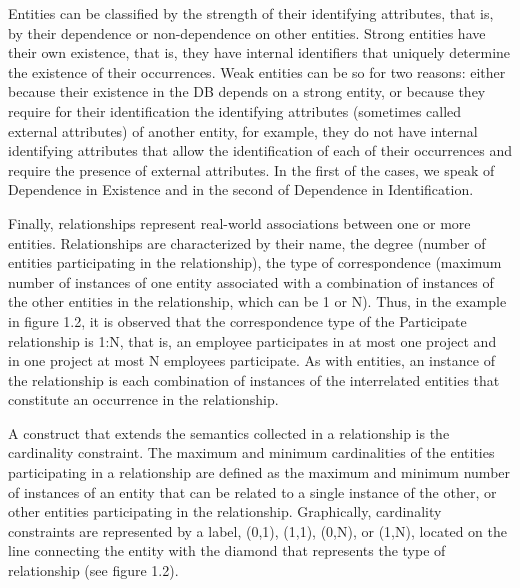 \documentclass{article}
\begin{document}
Entities can be classified by the strength of their identifying attributes, that is, by their dependence or non-dependence on other entities.  Strong entities have their own existence, that is, they have internal identifiers that uniquely determine the existence of their occurrences.  Weak entities can be so for two reasons: either because their existence in the DB depends on a strong entity, or because they require for their identification the identifying attributes (sometimes called external attributes) of another entity, for example, they do not have internal identifying attributes that allow the identification of each of their occurrences and require the presence of external attributes.  In the first of the cases, we speak of Dependence in Existence and in the second of Dependence in Identification.

Finally, relationships represent real-world associations between one or more entities.  Relationships are characterized by their name, the degree (number of entities participating in the relationship), the type of correspondence (maximum number of instances of one entity associated with a combination of instances of the other entities in the relationship, which can be 1 or N).  Thus, in the example in figure 1.2, it is observed that the correspondence type of the Participate relationship is 1:N, that is, an employee participates in at most one project and in one project at most N employees participate.  As with entities, an instance of the relationship is each combination of instances of the interrelated entities that constitute an occurrence in the relationship.

A construct that extends the semantics collected in a relationship is the cardinality constraint.  The maximum and minimum cardinalities of the entities participating in a relationship are defined as the maximum and minimum number of instances of an entity that can be related to a single instance of the other, or other entities participating in the relationship.  Graphically, cardinality constraints are represented by a label, (0,1), (1,1), (0,N), or (1,N), located on the line connecting the entity with the diamond that represents the type of relationship (see figure 1.2).
\end{document}
